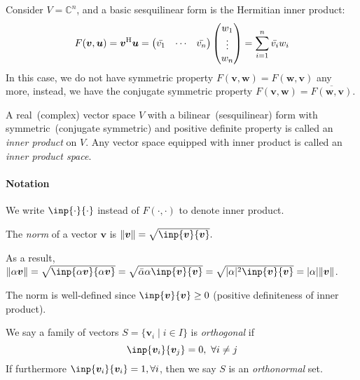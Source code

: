 \begin{example}
Consider $V=\mathbb{C}^n$, and a basic sesquilinear form is the Hermitian inner product:
\[
F(\bm v,\bm u)=\bm v^{\mathrm H}\bm u
=
\begin{pmatrix}
\bar{v_1}&\cdots&\bar{v_n}
\end{pmatrix}\begin{pmatrix}
w_1\\\vdots\\ w_n
\end{pmatrix}
=
\sum_{i=1}^n\bar{v_i}w_i
\]
In this case, we do not have symmetric property $F(\bm v,\bm w)=F(\bm w,\bm v)$ any more, instead, we have the conjugate symmetric property $F(\bm v,\bm w)=\overline{F(\bm w,\bm v)}$.
\end{example}

\begin{definition}
A real~(complex) vector space $V$ with a bilinear~(sesquilinear) form with symmetric~(conjugate symmetric) and positive definite property is called an \emph{inner product} on $V$.
Any vector space equipped with inner product is called an \emph{inner product space}.
\end{definition}
\paragraph{Notation}
We write $\inp{\cdot}{\cdot}$ instead of $F(\cdot,\cdot)$ to denote inner product.
\begin{definition}[Norm]
The \emph{norm} of a vector $\bm v$ is
$
\|\bm v\|=\sqrt{\inp{\bm v}{\bm v}}.
$
\end{definition}
\begin{remark}
As a result, $\|\alpha\bm v\|=\sqrt{\inp{\alpha\bm v}{\alpha\bm v}}=\sqrt{\bar{\alpha}\alpha\inp{\bm v}{\bm v}}
=
\sqrt{|\alpha|^2\inp{\bm v}{\bm v}}=|\alpha|\|\bm v\|$.

The norm is well-defined since $\inp{\bm v}{\bm v}\ge0$ (positive definiteness of inner product).
\end{remark}
\begin{definition}[Orthogonal]
We say a family of vectors $S=\{\bm v_i\mid i\in I\}$ is \emph{orthogonal} if 
\[
\inp{\bm v_i}{\bm v_j}=0,\ \forall i\ne j
\]
If furthermore $\inp{\bm v_i}{\bm v_i}=1,\forall i$, then we say $S$ is an \emph{orthonormal} set.
\end{definition}

